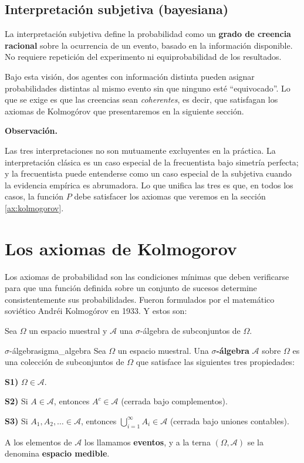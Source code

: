 \documentclass[12pt, a4paper]{book}
\newenvironment{observacion}{%
    \par\medskip\noindent\textbf{\color{azul}Observaci\'{o}n.}\enspace\itshape
}{\par\medskip}
\numberwithin{equation}{chapter}
\begin{document}
\subsection{Interpretación subjetiva (bayesiana)}

La interpretación subjetiva define la probabilidad como un \textbf{grado 
	de creencia racional} sobre la ocurrencia de un evento, basado en la 
información disponible. No requiere repetición del experimento ni 
equiprobabilidad de los resultados.

Bajo esta visión, dos agentes con información distinta pueden asignar 
probabilidades distintas al mismo evento sin que ninguno esté 
``equivocado''. Lo que se exige es que las creencias sean 
\textit{coherentes}, es decir, que satisfagan los axiomas de Kolmogórov que presentaremos en la siguiente sección.

\begin{observacion}
	Las tres interpretaciones no son mutuamente excluyentes en la 
	práctica. La interpretación clásica es un caso especial de la 
	frecuentista bajo simetría perfecta; y la frecuentista puede 
	entenderse como un caso especial de la subjetiva cuando la evidencia 
	empírica es abrumadora. Lo que unifica las tres es que, en todos los 
	casos, la función $P$ debe satisfacer los axiomas que veremos en la 
	sección \ref{ax:kolmogorov}.
\end{observacion}

\section{Los axiomas de Kolmogorov}

Los axiomas de probabilidad son las condiciones mínimas que deben verificarse para que una función definida sobre un conjunto de sucesos determine consistentemente sus probabilidades. Fueron formulados por el matemático soviético Andréi Kolmogórov en 1933. Y estos son:

\medskip
Sea $\Omega$ un espacio muestral y $\mathcal{A}$ una $\sigma$-álgebra de subconjuntos de $\Omega$.

\begin{definicion}{$\sigma$-álgebra}{sigma_algebra}
	Sea $\Omega$ un espacio muestral. Una \textbf{$\sigma$-álgebra} 
	$\mathcal{A}$ sobre $\Omega$ es una colección de subconjuntos de 
	$\Omega$ que satisface las siguientes tres propiedades:
	
	\medskip
	\noindent\textbf{S1)} $\Omega \in \mathcal{A}$.
	
	\medskip
	\noindent\textbf{S2)} Si $A \in \mathcal{A}$, entonces 
	$A^c \in \mathcal{A}$ \quad (cerrada bajo complementos).
	
	\medskip
	\noindent\textbf{S3)} Si $A_1, A_2, \ldots \in \mathcal{A}$, 
	entonces $\displaystyle\bigcup_{i=1}^{\infty} A_i \in \mathcal{A}$ 
	\quad (cerrada bajo uniones contables).
	
	\medskip
	A los elementos de $\mathcal{A}$ los llamamos \textbf{eventos}, y 
	a la terna $(\Omega, \mathcal{A})$ se la denomina 
	\textbf{espacio medible}.
\end{definicion}
\end{document}
